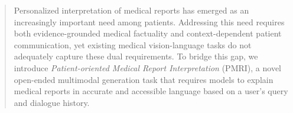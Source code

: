 \documentclass[letterpaper]{article} %
\begin{document}
\begin{abstract}
Personalized interpretation of medical reports has emerged as an increasingly important need among patients. Addressing this need requires both evidence-grounded medical factuality and context-dependent patient communication, yet existing medical vision-language tasks do not adequately capture these dual requirements.
To bridge this gap, we introduce \emph{Patient-oriented Medical Report Interpretation} (PMRI), a novel open-ended multimodal generation task that requires models to explain medical reports in accurate and accessible language based on a user's query and dialogue history.

\end{abstract}
\end{document}
